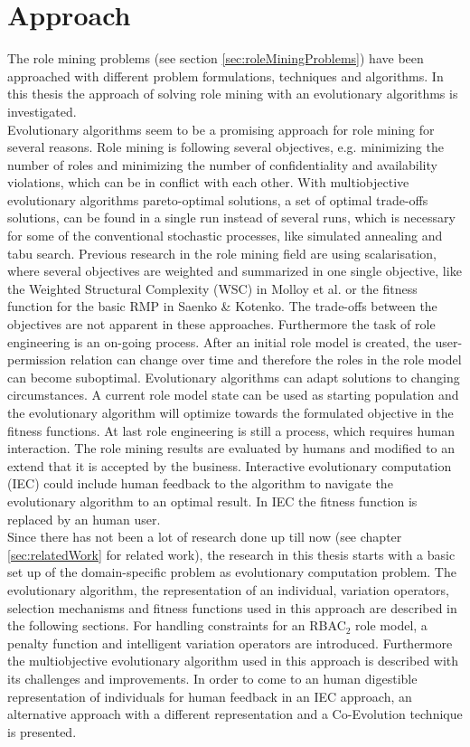 \newpage
\chapter{Approach}
\label{sec:approach}
The role mining problems (see section \ref{sec:roleMiningProblems}) have been approached with different problem formulations, techniques and algorithms. In this thesis the approach of solving role mining with an evolutionary algorithms is investigated.\\
Evolutionary algorithms seem to be a promising approach for role mining for several reasons. Role mining is following several objectives, e.g. minimizing the number of roles and minimizing the number of confidentiality and availability violations, which can be in conflict with each other. With multiobjective evolutionary algorithms pareto-optimal solutions, a set of optimal trade-offs solutions, can be found in a single run instead of several runs, which is necessary for some of the conventional stochastic processes, like simulated annealing and tabu search\cite{abraham2005evolutionary}. Previous research in the role mining field are using scalarisation, where several objectives are weighted and summarized in one single objective, like the Weighted Structural Complexity (WSC) in Molloy et al.\cite{Molloy} or the fitness function for the basic RMP in Saenko \& Kotenko\cite{saenko2012design}. The trade-offs between the objectives are not apparent in these approaches. Furthermore the task of role engineering is an on-going process. After an initial role model is created, the user-permission relation can change over time and therefore the roles in the role model can become suboptimal. Evolutionary algorithms can adapt solutions to changing circumstances\cite{Fogel:1997}. A current role model state can be used as starting population and the evolutionary algorithm will optimize towards the formulated objective in the fitness functions. At last role engineering is still a process, which requires human interaction. The role mining results are evaluated by humans and modified to an extend that it is accepted by the business. Interactive evolutionary computation (IEC)\cite{949485} could include human feedback to the algorithm to navigate the evolutionary algorithm to an optimal result. In IEC the fitness function is replaced by an human user.\\
Since there has not been a lot of research done up till now (see chapter \ref{sec:relatedWork} for related work), the research in this thesis starts with a basic set up of the domain-specific problem as evolutionary computation problem. The evolutionary algorithm, the representation of an individual, variation operators, selection mechanisms and fitness functions used in this approach are described in the following sections. For handling constraints for an RBAC$_2$ role model, a penalty function and intelligent variation operators are introduced. Furthermore the multiobjective evolutionary algorithm used in this approach is described with its challenges and improvements. In order to come to an human digestible representation of individuals for human feedback in an IEC approach, an alternative approach with a different representation and a Co-Evolution technique is presented.\\

